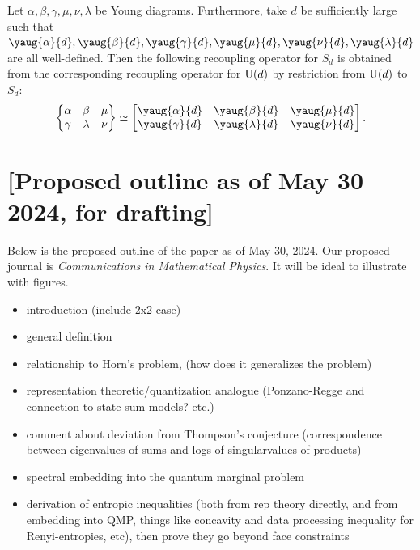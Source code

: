 \documentclass[notitlepage, 10pt]{article}
\begin{document}
\begin{cor}
    \label{cor:ud_sd_recouple_correspondence}
    Let $\alpha, \beta, \gamma, \mu, \nu, \lambda$ be Young diagrams. 
    Furthermore, take $d$ be sufficiently large such that $\yaug{\alpha}{d}, \yaug{\beta}{d}, \yaug{\gamma}{d}, \yaug{\mu}{d}, \yaug{\nu}{d}, \yaug{\lambda}{d}$ are all well-defined.
    Then the following recoupling operator for $S_d$ is obtained from the corresponding recoupling operator for $\operatorname{U}(d)$ by restriction from $\operatorname{U}(d)$ to $S_d$:
    \begin{equation}
        \begin{Bmatrix}\alpha & \beta & \mu \\ \gamma & \lambda & \nu \end{Bmatrix} \simeq
        \begin{bmatrix}\yaug{\alpha}{d} & \yaug{\beta}{d} & \yaug{\mu}{d} \\ \yaug{\gamma}{d} & \yaug{\lambda}{d} & \yaug{\nu}{d} \end{bmatrix}.
    \end{equation}
\end{cor}


\clearpage
\section*{[Proposed outline as of May 30 2024, for drafting]}

Below is the proposed outline of the paper as of May 30, 2024.
Our proposed journal is \textit{Communications in Mathematical Physics}.
It will be ideal to illustrate with figures.
\begin{itemize}
    \item introduction (include 2x2 case)
    \item general definition
    \item relationship to Horn's problem, (how does it generalizes the problem)
    \item representation theoretic/quantization analogue (Ponzano-Regge and connection to state-sum models? etc.)
    \item comment about deviation from Thompson's conjecture (correspondence between eigenvalues of sums and logs of singularvalues of products)
    \item spectral embedding into the quantum marginal problem
    \item derivation of entropic inequalities (both from rep theory directly, and from embedding into QMP, things like concavity and data processing inequality for Renyi-entropies, etc), then prove they go beyond face constraints
\end{itemize}
\end{document}
